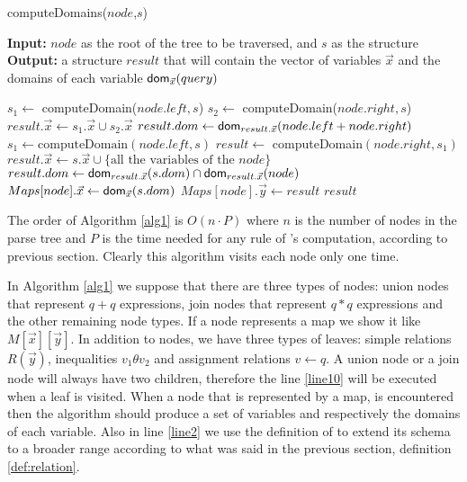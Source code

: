 \documentclass[12pt]{article}
\begin{document}
\begin{algorithm}[H]
\caption{computeDomains($node$,$s$)} 
\label{alg1}
\textbf{Input:} $node$ as the root of the tree to be traversed, and $s$ as the structure \\
\textbf{Output:} a structure $result$ that will contain the vector of variables $\vec x$ and the domains of each variable $\textsf{dom}{}_{\vec x}(query)$
\begin{algorithmic}[1]
\STATE  $s_{1}\gets$ computeDomain($node$.$left, s$)
\STATE  $s_{2}\gets$ computeDomain($node.right, s$)
\STATE  $result.\vec{x}\gets s_{1}.\vec{x} \cup s_{2}.\vec{x}$ 
\STATE  $result.dom\gets \text{\textsf{dom}}_{result.\vec x}(node.left + node.right)$
\label{line:join1}
\STATE  $s_{1} \gets \text{computeDomain}(node.left, s)$
\label{line:join2}
\STATE $result\gets$ computeDomain$(node.right, s_{1})$
\ELSE 
\label{line10}
\STATE $result.\vec{x}\gets s.\vec{x} \cup \{\text{all the variables of the $node$}\}$
\STATE $result.dom\gets \text{\textsf{dom}}_{result.\vec{x}}(s.dom)\cap\text{\textsf{dom}}_{result.\vec{x}}(node)$\label{line2}
\ENDIF
{}
\STATE $Maps[node].\vec{x}\gets\text{\textsf{dom}}_{\vec{x}}(s.dom)$
\STATE $Maps[node].\vec{y}\gets result$
\ENDIF
\RETURN $result$
\end{algorithmic}
\end{algorithm}
The order of Algorithm \ref{alg1} is $O(n\cdot P)$ where $n$ is the number of nodes in the parse tree and $P$ is the time needed for any rule of \dom{}'s computation, according to previous section. Clearly this algorithm visits each node only one time. \par

In Algorithm \ref{alg1} we suppose that there are three types of nodes: union nodes that represent $q+q$ expressions, join nodes that represent $q*q$ expressions and the other remaining node types. If a node represents a map we show it like $M[\vec x][\vec y]$. In addition to nodes, we have three types of leaves: simple relations $R(\vec y)$, inequalities $v_{1}\theta v_{2}$ and assignment relations $v \gets q$. A union node or a join node will always have two children, therefore the line \ref{line10} will be executed when a leaf is visited. When a node that is represented by a map, is encountered then the algorithm should produce a set of variables and respectively the domains of each variable. Also in line \ref{line2} we use the definition of \dom{} to extend its schema to a broader range according to what was said in the previous section, definition \eqref{def:relation}. \\\par
\end{document}
